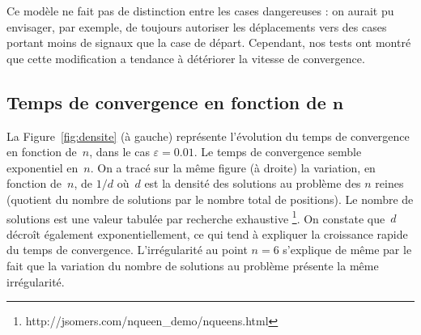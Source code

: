 Ce modèle ne fait pas de distinction  entre les cases dangereuses : on aurait pu
envisager, par  exemple, de toujours  autoriser les déplacements vers  des cases
portant moins de signaux que la  case de départ. Cependant, nos tests ont montré
que cette modification a tendance à détériorer la vitesse de convergence.


\subsection{Temps de convergence en fonction de $\boldsymbol n$}

  

La  Figure~\ref{fig:densite}  (à  gauche)  représente l'évolution  du  temps  de
convergence  en fonction  de~$n$, dans  le cas  $\varepsilon=0.01$. Le  temps de
convergence semble exponentiel en~$n$. On a  tracé sur la même figure (à droite)
la variation, en  fonction de~$n$, de $1/d$ où~$d$ est  la densité des solutions
au problème des $n$ reines (quotient  du nombre de solutions par le nombre total
de  positions).  Le nombre  de solutions  est une  valeur tabulée  par recherche
exhaustive  \footnote{http://jsomers.com/nqueen\_demo/nqueens.html}. On constate
que~$d$  décroît  également  exponentiellement,  ce  qui  tend  à  expliquer  la
croissance  rapide  du  temps  de  convergence. L'irrégularité  au  point  $n=6$
s'explique  de même  par le  fait que  la variation  du nombre  de  solutions au
problème présente  la même irrégularité. 

